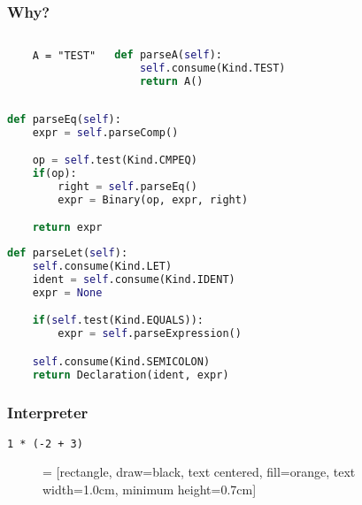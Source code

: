\documentclass{beamer}
\begin{document}
    \begin{frame}[fragile]
    \frametitle{Why?}
    \begin{columns}
    \begin{verbatim}
    A = "TEST"
    \end{verbatim}
    \pause
    \begin{lstlisting}[language=Python]
def parseA(self):
    self.consume(Kind.TEST)
    return A()
        \end{lstlisting}
    \end{columns}
    \end{frame}

    \begin{frame}[fragile]
    \begin{lstlisting}[language=Python]
def parseEq(self):
    expr = self.parseComp()

    op = self.test(Kind.CMPEQ)
    if(op):
        right = self.parseEq()
        expr = Binary(op, expr, right)

    return expr
    \end{lstlisting}
    \end{frame}

    \begin{frame}[fragile]
    \begin{lstlisting}[language=Python]
def parseLet(self):
    self.consume(Kind.LET)
    ident = self.consume(Kind.IDENT)
    expr = None

    if(self.test(Kind.EQUALS)):
        expr = self.parseExpression()

    self.consume(Kind.SEMICOLON)
    return Declaration(ident, expr)
    \end{lstlisting}
    \end{frame}

    \begin{frame}[fragile]
    \frametitle{Interpreter}
    \begin{lstlisting}[]
1 * (-2 + 3)
    \end{lstlisting}
    \begin{figure}
     = [rectangle, draw=black, text centered, fill=orange, text width=1.0cm, minimum height=0.7cm]
    \end{figure}
    \end{frame}
\end{document}
